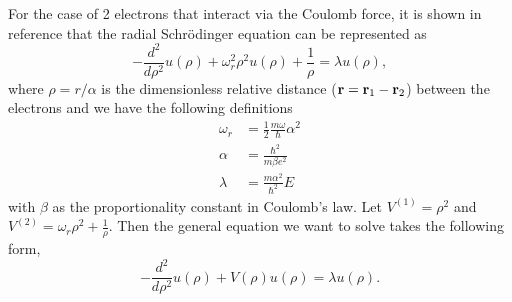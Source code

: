 \documentclass[a4paper,12pt]{report}
\begin{document}
For the case of 2 electrons that interact via the Coulomb force, it is shown in reference \cite{dux:2016} that the radial Schr\"odinger equation can be represented as 
\begin{equation}\label{eq:deho}
 -\frac{d^2}{d\rho^2}u(\rho) + \omega_r^2\rho^2 u(\rho) + \frac{1}{\rho} = \lambda u(\rho),
\end{equation}
where $\rho = r/\alpha$ is the dimensionless relative distance (${\bf r} =  {\bf r}_1 - {\bf r}_2$) between the electrons and we have the following definitions
\begin{align*}
 \omega_r &= \frac{1}{2}\frac{m\omega}{\hbar}\alpha^2\\
 \alpha &= \frac{\hbar^2}{m\beta e^2}\\
 \lambda &= \frac{m\alpha^2}{\hbar^2}E
\end{align*}
with $\beta$ as the proportionality constant in Coulomb's law. Let $V^{(1)} = \rho^2$ and $V^{(2)} = \omega_r \rho^2 + \frac{1}{\rho}$. Then the general equation we want to solve takes the following form,
\begin{equation}\label{eq:gensch}
  -\frac{d^2}{d\rho^2}u(\rho) + V(\rho)u(\rho) = \lambda u(\rho).
\end{equation}
\end{document}
